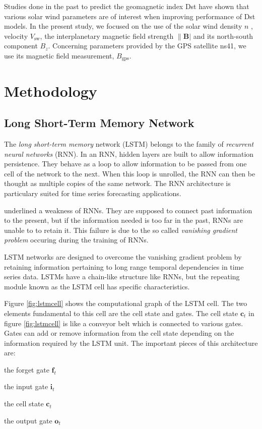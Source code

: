 Studies done in the past to predict the geomagnetic index Dst have shown that various solar wind parameters 
are of interest when improving performance of Dst models. In the present study, we focused on the use 
of the solar wind density $n$ , velocity  $V_{\text{sw}}$, the interplanetary magnetic field 
strength $\|\mathbf{B}|$ and its north-south component $B_{z}$. Concerning parameters provided by 
the GPS satellite ns41, we use its magnetic field measurement, $B_{\text{gps}}$.

\section{Methodology}\label{sec:methodgpnn}

\subsection{Long Short-Term Memory Network}\label{sec:lstmintro}

The \emph{long short-term memory} network (LSTM) belongs to the family of \emph{recurrent neural networks} (RNN). 
In an RNN, hidden layers are built to allow information persistence. They behave as a loop to allow information 
to be passed from one cell of the network to the next. When this loop is unrolled, the RNN can then be thought 
as multiple copies of the same network. The RNN architecture is particulary suited for time series forecasting 
applications. 

\citet{hochreiter1991untersuchungen,bengio1994learning} underlined a weakness of RNNs. They are supposed to connect 
past information to the present, but if the information needed is too far in the past, RNNs are unable to to retain it. 
This failure is due to the so called \emph{vanishing gradient problem} occuring during the training of RNNs. 

LSTM networks are designed to overcome the vanishing gradient problem by retaining information pertaining to long range 
temporal dependencies in time series data. LSTMs have a chain-like structure like RNNs, but the repeating module 
known as the LSTM cell has specific characteristics.

Figure \ref{fig:lstmcell} shows the computational graph of the LSTM cell. The two elements 
fundamental to this cell are the cell state and gates. The cell state $\mathbf{c}_{t}$ in figure \ref{fig:lstmcell} 
is like a conveyor belt which is connected to various gates. Gates can add or remove information from the cell 
state depending on the information required by the LSTM unit. The important pieces of this architecture are: 
\begin{itemize*} 
	\item the forget gate $\mathbf{f}_t$ 
	\item the input gate $\mathbf{i}_t$ 
	\item the cell state $\mathbf{c}_t$ 
	\item the output gate $\mathbf{o}_t$  
\end{itemize*}  

